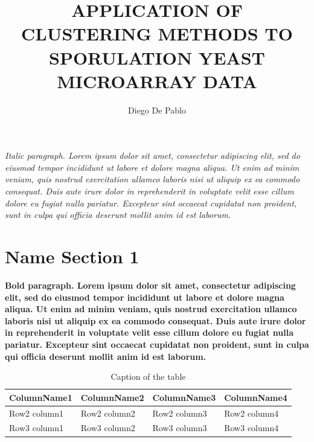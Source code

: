 \documentclass{llncs}
\begin{document}
\title{APPLICATION OF CLUSTERING METHODS TO
	SPORULATION YEAST MICROARRAY DATA}

\author{Diego De Pablo}

\maketitle 

\vspace{1cm} %

\textit{Italic paragraph. Lorem ipsum dolor sit amet, consectetur adipiscing elit, sed do eiusmod tempor incididunt ut labore et dolore magna aliqua. Ut enim ad minim veniam, quis nostrud exercitation ullamco laboris nisi ut aliquip ex ea commodo consequat. Duis aute irure dolor in reprehenderit in voluptate velit esse cillum dolore eu fugiat nulla pariatur. Excepteur sint occaecat cupidatat non proident, sunt in culpa qui officia deserunt mollit anim id est laborum.}


\section{Name Section 1}

\textbf{Bold paragraph. Lorem ipsum dolor sit amet, consectetur adipiscing elit, sed do eiusmod tempor incididunt ut labore et dolore magna aliqua. Ut enim ad minim veniam, quis nostrud exercitation ullamco laboris nisi ut aliquip ex ea commodo consequat. Duis aute irure dolor in reprehenderit in voluptate velit esse cillum dolore eu fugiat nulla pariatur. Excepteur sint occaecat cupidatat non proident, sunt in culpa qui officia deserunt mollit anim id est laborum.}

\begin{table}
    \label{tab:example1}
 	\caption{Caption of the table}
	\centering
	\begin{tabular}{C|CCC}
 		\toprule
 		ColumnName1 & ColumnName2 & ColumnName3  & ColumnName4 \\
 		\midrule
 		Row2 column1 & Row2 column2 & Row2 column3 & Row2 column4 \\
   		Row3 column1 & Row3 column2 & Row3 column3 & Row3 column4 \\
 		\bottomrule
 	\end{tabular}
\end{table}
 
\end{document}
